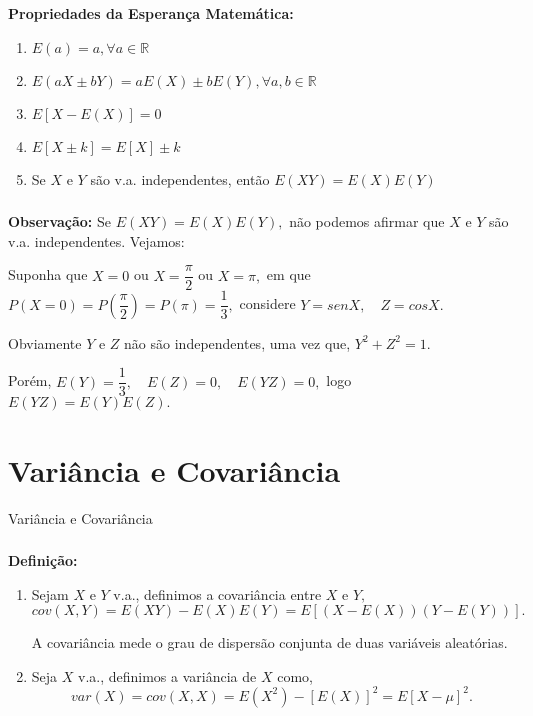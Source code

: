 \documentclass[14pt,aspectratio=1610]{beamer}
\begin{document}
\begin{frame}{}
\frametitle{}
\begin{block}{}
\justifying
\textbf{Propriedades da Esperança Matemática:}
\begin{enumerate}
\item $E(a)=a, \forall a\in \mathbb{R}$\pause
\item $E(aX\pm bY)=aE(X)\pm bE(Y), \forall a,b\in \mathbb{R}$\pause
\item $E[X-E(X)]=0$\pause
\item $E[X \pm k]=E[X]\pm k$\pause
\item Se $X$ e $Y$ são v.a. independentes, então $E(XY)=E(X)E(Y)$
\end{enumerate}
\end{block}
\end{frame}

\begin{frame}{}
\frametitle{}
\begin{block}{}
\justifying
\textbf{Observação:} Se $E(XY)=E(X)E(Y),$ não podemos afirmar que $X$ e $Y$ são v.a. independentes. Vejamos:

Suponha que $X=0$ ou $X=\dfrac{\pi}{2}$ ou $X=\pi,$ em que 
$P(X=0)=P(\dfrac{\pi}{2})=P(\pi)=\dfrac{1}{3},$ considere $Y=senX,\quad Z=cosX.$

Obviamente $Y$ e $Z$ não são independentes, uma vez que, $Y^{2}+Z^{2}=1.$ 

Porém, $E(Y)=\dfrac{1}{3},\quad E(Z)=0,\quad E(YZ)=0,$ logo $E(YZ)=E(Y)E(Z).$

\end{block}
\end{frame}

\section{Variância e Covariância}
\begin{frame}{Variância e Covariância}
\frametitle{}
\begin{block}{}
\justifying
\textbf{Definição:} 
\begin{enumerate}
\item Sejam $X$ e $Y$ v.a., definimos a covariância entre $X$ e $Y,$ $$cov(X,Y)=E(XY)-E(X)E(Y)=E[(X-E(X))(Y-E(Y))].$$

A covariância mede o grau de dispersão conjunta de duas variáveis aleatórias.\pause

\item Seja $X$ v.a., definimos a variância de $X$ como, $$var(X)=cov(X,X)=E(X^{2})-[E(X)]^{2}=E[X-\mu]^{2}.$$

\end{enumerate}

\end{block}
\end{frame}
\end{document}
